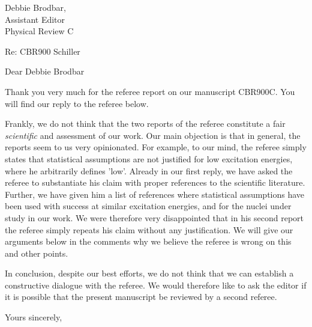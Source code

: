 \documentclass{letter}
\begin{document}
\address{Andreas Schiller\\
L-414, LLNL\\
7000 East Avenue\\
Livermore, CA-94551}

\signature{Andreas Schiller}

\begin{letter}{Debbie Brodbar,\\
Assistant Editor\\
Physical Review C}

\opening{Re: CBR900 Schiller}

Dear Debbie Brodbar

Thank you very much for the referee report on our manuscript CBR900C\@. You 
will find our reply to the referee below.

Frankly, we do not think that the two reports of the referee constitute a fair
{\em scientific} and assessment of our work. Our main objection is that in 
general, the reports seem to us very opinionated. For example, to our mind, the
referee simply states that statistical assumptions are not justified for low 
excitation energies, where he arbitrarily defines 'low'. Already in our first 
reply, we have asked the referee to substantiate his claim with proper 
references to the scientific literature. Further, we have given him a list of 
references where statistical assumptions have been used with success at similar
excitation energies, and for the nuclei under study in our work. We were 
therefore very disappointed that in his second report the referee simply 
repeats his claim without any justification. We will give our arguments below 
in the comments why we believe the referee is wrong on this and other points.

In conclusion, despite our best efforts, we do not think that we can establish 
a constructive dialogue with the referee. We would therefore like to ask the 
editor if it is possible that the present manuscript be reviewed by a second 
referee.

\closing{Yours sincerely,}

\end{letter}
\end{document}
